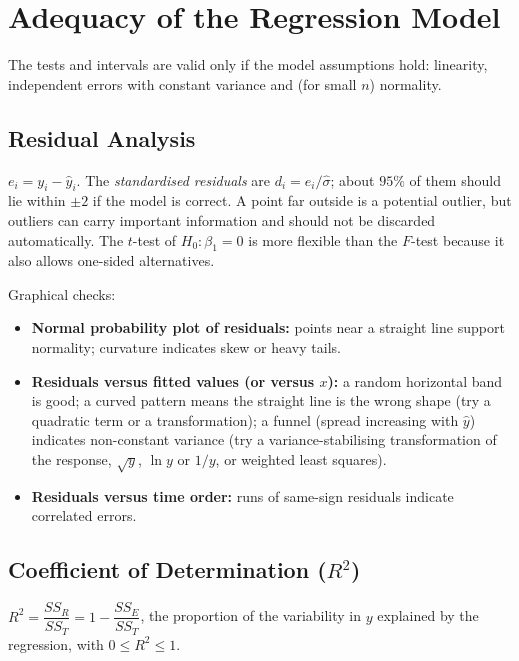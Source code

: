 \section{Adequacy of the Regression Model}

The tests and intervals are valid only if the model assumptions hold: linearity, independent errors with constant variance and (for small $n$) normality.

\subsection{Residual Analysis}

\begin{definition}[Residuals]
$e_i=y_i-\hat{y}_i$. The \emph{standardised residuals} are $d_i=e_i/\hat\sigma$; about $95\%$ of them should lie within $\pm2$ if the model is correct. A point far outside is a potential outlier, but outliers can carry important information and should not be discarded automatically. The $t$-test of $H_0:\beta_1=0$ is more flexible than the $F$-test because it also allows one-sided alternatives.
\end{definition}

Graphical checks:
\begin{itemize}
  \item \textbf{Normal probability plot of residuals:} points near a straight line support normality; curvature indicates skew or heavy tails.
  \item \textbf{Residuals versus fitted values (or versus $x$):} a random horizontal band is good; a curved pattern means the straight line is the wrong shape (try a quadratic term or a transformation); a funnel (spread increasing with $\hat{y}$) indicates non-constant variance (try a variance-stabilising transformation of the response, $\sqrt{y}$, $\ln y$ or $1/y$, or weighted least squares).
  \item \textbf{Residuals versus time order:} runs of same-sign residuals indicate correlated errors.
\end{itemize}

\subsection{Coefficient of Determination ($R^2$)}\label{sec:regr2}

\begin{definition}[$R^2$]
$R^2=\dfrac{SS_R}{SS_T}=1-\dfrac{SS_E}{SS_T}$, the proportion of the variability in $y$ explained by the regression, with $0\le R^2\le1$.
\end{definition}

